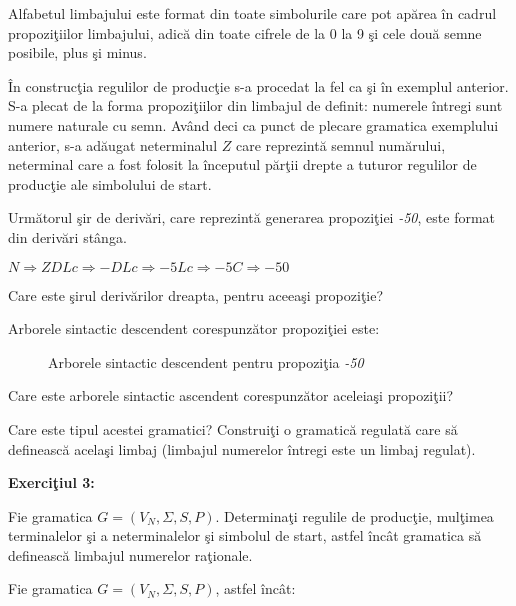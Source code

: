 Alfabetul limbajului este format din toate simbolurile care pot apărea în cadrul propoziţiilor limbajului, adică din toate cifrele de la 0 la 9 şi cele două semne posibile, plus şi minus.

În construcţia regulilor de producţie s-a procedat la fel ca şi în exemplul anterior. S-a plecat de la forma propoziţiilor din limbajul de definit: numerele întregi sunt numere naturale cu semn. Având deci ca punct de plecare gramatica exemplului anterior, s-a adăugat neterminalul $Z$ care reprezintă semnul numărului, neterminal care a fost folosit la începutul părţii drepte a tuturor regulilor de producţie ale simbolului de start.

Următorul şir de derivări, care reprezintă generarea propoziţiei \textit{-50}, este format din derivări stânga.

$ N \Rightarrow ZDLc \Rightarrow -DLc \Rightarrow -5Lc \Rightarrow -5C \Rightarrow -50$ 

Care este şirul derivărilor dreapta, pentru aceeaşi propoziţie?

Arborele sintactic descendent corespunzător propoziţiei este:

\begin{figure}[H]
\centering
{} 
\caption{Arborele sintactic descendent pentru propoziţia \textit{-50}}
\end{figure}

Care este arborele sintactic ascendent corespunzător aceleiaşi propoziţii?

Care este tipul acestei gramatici? Construiţi o gramatică regulată care să definească acelaşi limbaj (limbajul numerelor întregi este un limbaj regulat).

\textbf{Exerciţiul 3:}

Fie gramatica $G = (V_{N}, \Sigma, S, P)$. Determinaţi regulile de producţie, mulţimea terminalelor şi a neterminalelor şi simbolul de start, astfel încât gramatica să definească limbajul numerelor raţionale.

Fie gramatica $G = (V_{N}, \Sigma, S, P)$, astfel încât:

